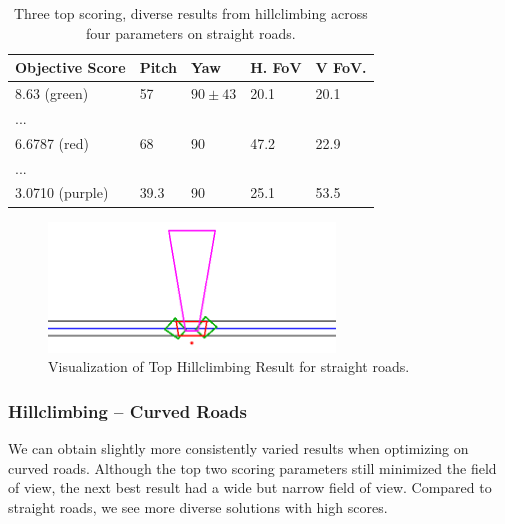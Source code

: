 \documentclass[a4paper,12pt,twoside,openright]{report}
\begin{document}
\begin{table}[htb]
    \centering
    \caption[Hillclimbing Top Scorers]{Three top scoring, diverse results from hillclimbing across four parameters on straight roads.}
    \label{tab:simpleobjective:hillclimb}
    \begin{tabular}{@{}lllll@{}}
        \toprule
        Objective Score & Pitch & Yaw   & H. FoV & V FoV. \\ \midrule
        8.63 (green)            & 57 & $90\pm43$ & 20.1  & 20.1  \\
        ... \\
        6.6787 (red)          & 68 & 90 & 47.2  & 22.9 \\
        ... \\
        3.0710 (purple)          & 39.3 & 90 & 25.1  & 53.5  \\ 
        \bottomrule
    \end{tabular}
\end{table}


\begin{figure}[htb]
    \centering
    \includegraphics[width=3in]{figures/simple_objective/top_hillclimb.png}
    \caption[Top Hillclimbing Result]{Visualization of Top Hillclimbing Result for straight roads.}
    \label{fig:simpleobjective:hillclimbing straight}
\end{figure}

\subsubsection{Hillclimbing -- Curved Roads}

We can obtain slightly more consistently varied results when optimizing
on curved roads. Although the top two scoring parameters
still minimized the field of view, the next best result
had a wide but narrow field of view. Compared to straight roads,
we see more diverse solutions with high scores.
\end{document}

